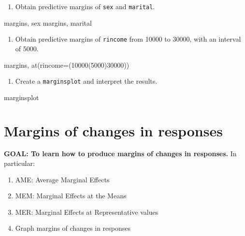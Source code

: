 \documentclass[
]{book}
\newenvironment{Shaded}{\begin{snugshade}}{\end{snugshade}}
\newcommand{\FunctionTok}[1]{\textcolor[rgb]{0.00,0.00,0.00}{#1}}
\newcommand{\NormalTok}[1]{#1}
\providecommand{\tightlist}{%
  \setlength{\itemsep}{0pt}\setlength{\parskip}{0pt}}
\begin{document}
\begin{enumerate}
\def\labelenumi{\arabic{enumi}.}
\setcounter{enumi}{1}
\tightlist
\item
  Obtain predictive margins of \texttt{sex} and \texttt{marital}.
\end{enumerate}

\begin{Shaded}
\begin{Highlighting}[]
\NormalTok{margins, sex }
\NormalTok{margins, marital}
\end{Highlighting}
\end{Shaded}

\begin{enumerate}
\def\labelenumi{\arabic{enumi}.}
\setcounter{enumi}{2}
\tightlist
\item
  Obtain predictive margins of \texttt{rincome} from 10000 to 30000, with an interval of 5000.
\end{enumerate}

\begin{Shaded}
\begin{Highlighting}[]
\NormalTok{margins, }\FunctionTok{at}\NormalTok{(rincome=(10000(5000)30000))}
\end{Highlighting}
\end{Shaded}

\begin{enumerate}
\def\labelenumi{\arabic{enumi}.}
\setcounter{enumi}{3}
\tightlist
\item
  Create a \texttt{marginsplot} and interpret the results.
\end{enumerate}

\begin{Shaded}
\begin{Highlighting}[]
\NormalTok{marginsplot }
\end{Highlighting}
\end{Shaded}

\hypertarget{margins-of-changes-in-responses}{%
\section{Margins of changes in responses}\label{margins-of-changes-in-responses}}

\textbf{GOAL: To learn how to produce margins of changes in responses.} In particular:

\begin{enumerate}
\def\labelenumi{\arabic{enumi}.}
\tightlist
\item
  AME: Average Marginal Effects
\item
  MEM: Marginal Effects at the Means
\item
  MER: Marginal Effects at Representative values
\item
  Graph margins of changes in responses
\end{enumerate}
\end{document}
